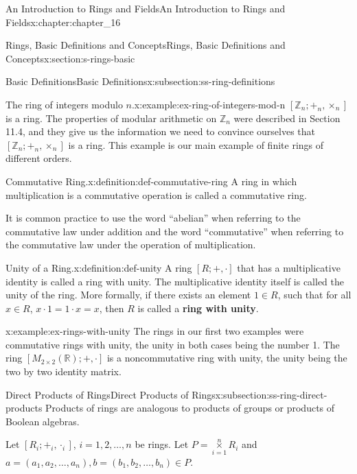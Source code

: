 \documentclass[oneside,10pt,]{book}
\newcommand{\terminology}[1]{\textbf{#1}}
\numberwithin{equation}{section}
\begin{document}
\begin{chapterptx}{An Introduction to Rings and Fields}{}{An Introduction to Rings and Fields}{}{}{x:chapter:chapter_16}
\begin{sectionptx}{Rings, Basic Definitions and Concepts}{}{Rings, Basic Definitions and Concepts}{}{}{x:section:s-rings-basic}
\begin{subsectionptx}{Basic Definitions}{}{Basic Definitions}{}{}{x:subsection:ss-ring-definitions}
\begin{example}{The ring of integers modulo \(n\).}{x:example:ex-ring-of-integers-mod-n}%
\(\left[\mathbb{Z}_n; +_n, \times_n\right]\) is a ring. The properties of modular arithmetic on \(\mathbb{Z}_n\) were described in Section 11.4, and they give us the information we need to convince ourselves that \(\left[\mathbb{Z}_n; +_n, \times_n\right]\) is a ring. This example is our main example of finite rings of different orders.%
\end{example}
\begin{definition}{Commutative Ring.}{x:definition:def-commutative-ring}%
%
A ring in which multiplication is a commutative operation is called a commutative ring.%
\end{definition}
It is common practice to use the word ``abelian'' when referring to the commutative law under addition and the word ``commutative'' when referring to the commutative law under the operation of multiplication.%
\begin{definition}{Unity of a Ring.}{x:definition:def-unity}%
%
%
A ring \([R; + , \cdot ]\) that has a multiplicative identity is called a ring with unity. The multiplicative identity itself is called the unity of the ring. More formally, if there exists an element \(1 \in R\), such that for all \(x \in R\), \(x\cdot 1 = 1\cdot x = x\), then \(R\) is called a \terminology{ring with unity}.%
\end{definition}
\begin{example}{}{x:example:ex-rings-with-unity}%
The rings in our first two examples were commutative rings with unity, the unity in both cases being the number 1. The ring \(\left[M_{2\times 2}(\mathbb{R}); + , \cdot \right]\) is a noncommutative ring with unity, the unity being the two by two identity matrix.%
\end{example}
\end{subsectionptx}
%
%
\typeout{************************************************}
\typeout{************************************************}
%
\begin{subsectionptx}{Direct Products of Rings}{}{Direct Products of Rings}{}{}{x:subsection:ss-ring-direct-products}
Products of rings are analogous to products of groups or products of Boolean algebras.%
\par
Let \([R_i; +_i, \cdot_i]\), \(i = 1, 2, \ldots , n\) be rings.  Let \(P=\underset{i=1}{\overset{n}{\times}}R_i\) and \(a = (a_1, a_2 , \ldots , a_n), b = (b_1, b_2, \ldots, b_n)\in P\).%

\end{subsectionptx}
\end{sectionptx}
\end{chapterptx}
\end{document}
